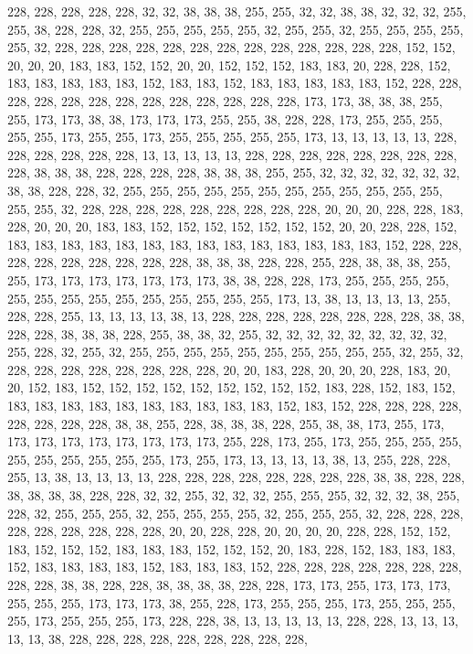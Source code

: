 {	228, 228, 228, 228, 228, 32,  32,  38,  38,  38,  255, 255, 32,  32,  38,  38,  32,  32,  32,  255, 255, 38,  228, 228, 32,  255, 255, 255, 255, 255, 32,  255, 255, 32,  255, 255, 255, 255, 255, 32,  228, 228, 228, 228, 228, 228, 228, 228, 228, 228, 228, 228, 228, 152, 152, 20,  20,  20,  183, 183, 152, 152, 20,  20,  152, 152, 152, 183, 183, 20,  228, 228, 152, 183, 183, 183, 183, 183, 152, 183, 183, 152, 183, 183, 183, 183, 183, 152, 228, 228, 228, 228, 228, 228, 228, 228, 228, 228, 228, 228, 228, 173, 173, 38,  38,  38,  255, 255, 173, 173, 38,  38,  173, 173, 173, 255, 255, 38,  228, 228, 173, 255, 255, 255, 255, 255, 173, 255, 255, 173, 255, 255, 255, 255, 255, 173, 13,  13,  13,  13,  13,  228, 228, 228, 228, 228, 228, 13,  13,  13,  13,  13,  228, 228, 228, 228, 228, 228, 228, 228, 
	228, 38,  38,  38,  228, 228, 228, 228, 38,  38,  38,  255, 255, 32,  32,  32,  32,  32,  32,  32,  38,  38,  228, 228, 32,  255, 255, 255, 255, 255, 255, 255, 255, 255, 255, 255, 255, 255, 255, 32,  228, 228, 228, 228, 228, 228, 228, 228, 228, 20,  20,  20,  228, 228, 183, 228, 20,  20,  20,  183, 183, 152, 152, 152, 152, 152, 152, 152, 20,  20,  228, 228, 152, 183, 183, 183, 183, 183, 183, 183, 183, 183, 183, 183, 183, 183, 183, 152, 228, 228, 228, 228, 228, 228, 228, 228, 228, 38,  38,  38,  228, 228, 255, 228, 38,  38,  38,  255, 255, 173, 173, 173, 173, 173, 173, 173, 38,  38,  228, 228, 173, 255, 255, 255, 255, 255, 255, 255, 255, 255, 255, 255, 255, 255, 255, 173, 13,  38,  13,  13,  13,  13,  255, 228, 228, 255, 13,  13,  13,  13,  38,  13,  228, 228, 228, 228, 228, 228, 228, 228, 
	38,  38,  228, 228, 38,  38,  38,  228, 255, 38,  38,  32,  255, 32,  32,  32,  32,  32,  32,  32,  32,  32,  255, 228, 32,  255, 32,  255, 255, 255, 255, 255, 255, 255, 255, 255, 255, 32,  255, 32,  228, 228, 228, 228, 228, 228, 228, 228, 20,  20,  183, 228, 20,  20,  20,  228, 183, 20,  20,  152, 183, 152, 152, 152, 152, 152, 152, 152, 152, 152, 183, 228, 152, 183, 152, 183, 183, 183, 183, 183, 183, 183, 183, 183, 183, 152, 183, 152, 228, 228, 228, 228, 228, 228, 228, 228, 38,  38,  255, 228, 38,  38,  38,  228, 255, 38,  38,  173, 255, 173, 173, 173, 173, 173, 173, 173, 173, 173, 255, 228, 173, 255, 173, 255, 255, 255, 255, 255, 255, 255, 255, 255, 255, 173, 255, 173, 13,  13,  13,  13,  38,  13,  255, 228, 228, 255, 13,  38,  13,  13,  13,  13,  228, 228, 228, 228, 228, 228, 228, 228, 
	38,  38,  228, 228, 38,  38,  38,  38,  228, 228, 32,  32,  255, 32,  32,  32,  255, 255, 255, 32,  32,  32,  38,  255, 228, 32,  255, 255, 255, 32,  255, 255, 255, 255, 32,  255, 255, 255, 32,  228, 228, 228, 228, 228, 228, 228, 228, 228, 20,  20,  228, 228, 20,  20,  20,  20,  228, 228, 152, 152, 183, 152, 152, 152, 183, 183, 183, 152, 152, 152, 20,  183, 228, 152, 183, 183, 183, 152, 183, 183, 183, 183, 152, 183, 183, 183, 152, 228, 228, 228, 228, 228, 228, 228, 228, 228, 38,  38,  228, 228, 38,  38,  38,  38,  228, 228, 173, 173, 255, 173, 173, 173, 255, 255, 255, 173, 173, 173, 38,  255, 228, 173, 255, 255, 255, 173, 255, 255, 255, 255, 173, 255, 255, 255, 173, 228, 228, 38,  13,  13,  13,  13,  13,  228, 228, 13,  13,  13,  13,  13,  38,  228, 228, 228, 228, 228, 228, 228, 228, 228, 
}
